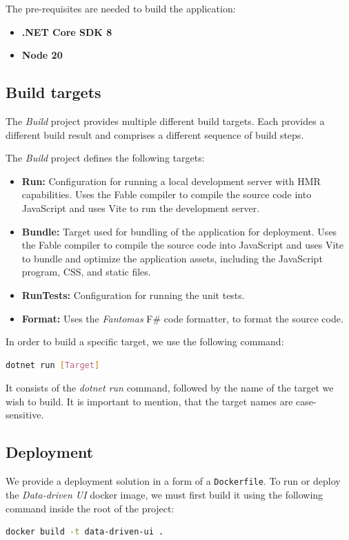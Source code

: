 The pre-requisites are needed to build the application:
\begin{itemize}
	\item \textbf{.NET Core SDK 8}
	\item \textbf{Node 20}
\end{itemize}

\medskip
\subsection{Build targets}
The \emph{Build} project provides multiple different build targets.
Each provides a different build result and comprises a different sequence of build steps.

The \emph{Build} project defines the following targets:
\begin{itemize}
	\item \textbf{Run:} Configuration for running a local development server with HMR capabilities.
	      Uses the Fable compiler to compile the source code into JavaScript and uses Vite to run the development server.
	\item \textbf{Bundle:} Target used for bundling of the application for deployment.
	      Uses the Fable compiler to compile the source code into JavaScript and uses Vite to
	      bundle and optimize the application assets, including the JavaScript program, CSS, and static files.
	\item \textbf{RunTests:} Configuration for running the unit tests.
	\item \textbf{Format:} Uses the \emph{Fantomas} F\# code formatter, to format the source code.
\end{itemize}

In order to build a specific target, we use the following command:
\begin{lstlisting}[language=bash]
  dotnet run [Target] 
\end{lstlisting}
It consists of the \emph{dotnet run} command, followed by the name of the target we wish to build.
It is important to mention, that the target names are case-sensitive.
\medskip
\subsection{Deployment}
We provide a deployment solution in a form of a \texttt{Dockerfile}.
To run or deploy the \emph{Data-driven UI} docker image, we must first build it using the following command inside the root of the project:
\begin{lstlisting}[language=bash]
  docker build -t data-driven-ui .  
\end{lstlisting}

